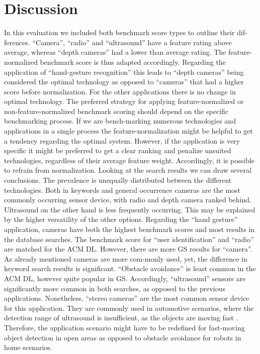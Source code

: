 \section{Discussion}
In this evaluation we included both benchmark score types to outline their dif-ferences. “Camera”, “radio” and “ultrasound” have a feature rating above average, whereas “depth cameras” had a lower than average rating. The feature-normalized benchmark score is thus adapted accordingly. Regarding the application of “hand-gesture recognition” this leads to “depth cameras” being considered the optimal technology as opposed to “cameras” that had a higher score before normalization. For the other applications there is no change in optimal technology. The preferred strategy for applying feature-normalized or non-feature-normalized benchmark scoring should depend on the specific benchmarking process. If we are bench-marking numerous technologies and applications in a single process the feature-normalization might be helpful to get a tendency regarding the optimal system. However, if the application is very specific it might be preferred to get a clear ranking and penalize unsuited technologies, regardless of their average feature weight. Accordingly, it is possible to refrain from normalization.
Looking at the search results we can draw several conclusions. The prevalence is unequally distributed between the different technologies. Both in keywords and general occurrence cameras are the most commonly occurring sensor device, with radio and depth camera ranked behind. Ultrasound on the other hand is less frequently occurring. This may be explained by the higher versatility of the other options. Regarding the “hand gesture” application, cameras have both the highest benchmark scores and most results in the database searches. The benchmark score for “user identification” and “radio” are matched for the ACM DL. However, there are more GS results for “camera”. As already mentioned cameras are more com-monly used, yet, the difference in keyword search results is significant. “Obstacle avoidance” is least common in the ACM DL, however quite popular in GS. Accordingly, “ultrasound” sensors are significantly more common in both searches, as opposed to the previous applications. Nonetheless, “stereo cameras” are the most common sensor device for this application. They are commonly used in automotive scenarios, where the detection range of ultrasound is insufficient, as the objects are moving fast \cite{bertozzi1998gold}. Therefore, the application scenario might have to be redefined for fast-moving object detection in open areas as opposed to obstacle avoidance for robots in home scenarios. 
